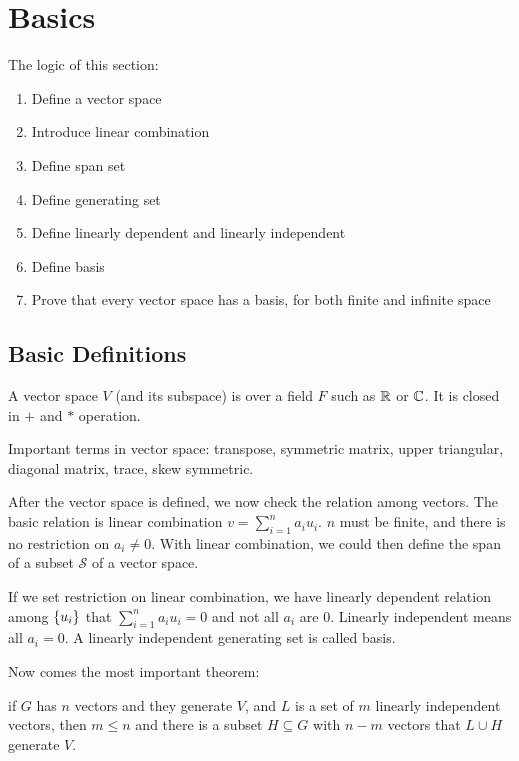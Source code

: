 \chapter{Basics}

The logic of this section:
\begin{enumerate}
    \item Define a vector space
    \item Introduce linear combination
    \item Define span set
    \item Define generating set
    \item Define linearly dependent and linearly independent
    \item Define basis
    \item Prove that every vector space has a basis, for both finite and infinite space
\end{enumerate}

\section{Basic Definitions}



A vector space $V$ (and its subspace) is over a field $F$ such as $\mathbb{R}$ or $\mathbb{C}$. It is closed in $+$ and $*$ operation.


Important terms in vector space: transpose, symmetric matrix, upper triangular, diagonal matrix, trace, skew symmetric.

After the vector space is defined, we now check the relation among vectors. The basic relation is linear combination $v = \sum_{i=1}^{n} a_i u_i$. $n$ must be finite, and there is no restriction on $a_i \neq 0$. With linear combination, we could then define the span of a subset $\mathcal{S}$ of a vector space. 

If we set restriction on linear combination, we have linearly dependent relation among $\set{u_i}$ that $\sum_{i=1}^{n} a_i u_i = 0$ and not all $a_i$ are $0$. Linearly independent means all $a_i = 0$. A linearly independent generating set is called basis.



Now comes the most important theorem:
\begin{theorem}\label{replacement_theorem}
    if $G$ has $n$ vectors and they generate $V$, and $L$ is a set of $m$ linearly independent vectors, then $m \leq n$ and there is a subset $H \subseteq G$ with $n-m$ vectors that $L \cup H $ generate $V$.
    
\end{theorem}

